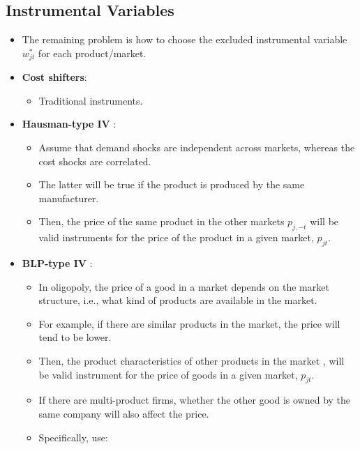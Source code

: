 \documentclass[]{book}
\providecommand{\tightlist}{%
  \setlength{\itemsep}{0pt}\setlength{\parskip}{0pt}}
\begin{document}
\subsection{Instrumental Variables}\label{instrumental-variables}

\begin{itemize}
\tightlist
\item
  The remaining problem is how to choose the excluded instrumental
  variable \(w_{jt}^*\) for each product/market.
\item
  \textbf{Cost shifters}:

  \begin{itemize}
  \tightlist
  \item
    Traditional instruments.
  \end{itemize}
\item
  \textbf{Hausman-type IV} \citep{Hausman1994}:

  \begin{itemize}
  \tightlist
  \item
    Assume that demand shocks are independent across markets, whereas
    the cost shocks are correlated.
  \item
    The latter will be true if the product is produced by the same
    manufacturer.
  \item
    Then, the price of the same product in the other markets
    \(p_{j, -t}\) will be valid instruments for the price of the product
    in a given market, \(p_{jt}\).
  \end{itemize}
\item
  \textbf{BLP-type IV} \citep{Berry1995a}:

  \begin{itemize}
  \tightlist
  \item
    In oligopoly, the price of a good in a market depends on the market
    structure, i.e., what kind of products are available in the market.
  \item
    For example, if there are similar products in the market, the price
    will tend to be lower.
  \item
    Then, the product characteristics of other products in the market ,
    will be valid instrument for the price of goods in a given market,
    \(p_{jt}\).
  \item
    If there are multi-product firms, whether the other good is owned by
    the same company will also affect the price.
  \item
    Specifically, \citet{Berry1995a} use:
  \end{itemize}
\end{itemize}
\end{document}

